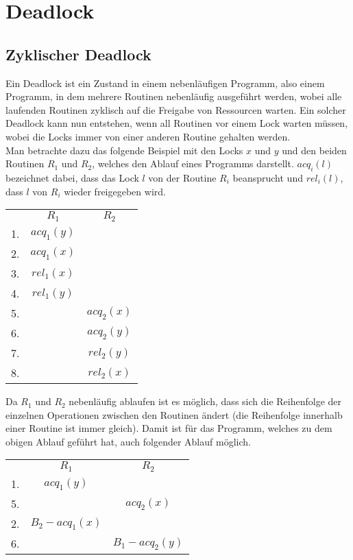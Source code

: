 \section{Deadlock} \label{Kap::Theo:Deadlocks}
\subsection{Zyklischer Deadlock}
Ein Deadlock ist ein Zustand in einem nebenläufigen Programm, also einem 
Programm, in dem mehrere Routinen nebenläufig ausgeführt werden, wobei alle 
laufenden Routinen zyklisch auf die Freigabe von Ressourcen warten.
Ein solcher Deadlock kann nun entstehen, wenn all Routinen vor einem Lock warten 
müssen, wobei die Locks immer von einer anderen Routine gehalten werden.\\
Man betrachte dazu das folgende Beispiel \cite{sulzmann} mit den Locks $x$ und $y$ 
und den beiden Routinen $R_1$ und $R_2$, welches den Ablauf eines Programms 
darstellt. $acq_i(l)$ bezeichnet dabei, dass das Lock $l$ von der Routine $R_i$ 
beansprucht und $rel_i(l)$, dass $l$ von $R_i$ wieder freigegeben wird.
\begin{table}[H]
    \centering
    \begin{tabular}{ccc}
       & $R_1$        & $R_2$          \\
    1. & $acq_{1}(y)$ &                \\
    2. & $acq_{1}(x)$ &                \\
    3. & $rel_{1}(x)$ &                \\
    4. & $rel_{1}(y)$ &                \\
    5. &              & $acq_{2}(x)$ \\
    6. &              & $acq_{2}(y)$ \\
    7. &              & $rel_{2}(y)$ \\
    8. &              & $rel_{2}(x)$
    \end{tabular}
\end{table}
Da $R_1$ und $R_2$ nebenläufig ablaufen ist es möglich, dass sich die 
Reihenfolge der einzelnen Operationen zwischen den Routinen ändert (die Reihenfolge
innerhalb einer Routine ist immer gleich). Damit ist für das Programm, welches 
zu dem obigen Ablauf geführt hat, auch folgender Ablauf möglich. 
\begin{table}[H]
    \centering
    \begin{tabular}{ccc}
       & $R_1$          & $R_2$          \\
    1. & $acq_{1}(y)$ &                \\
    5. &                & $acq_{2}(x)$ \\
    2. & $B_2-acq_{1}(x)$ &                \\
    6. &                & $B_1-acq_{2}(y)$
    \end{tabular}
\end{table}

